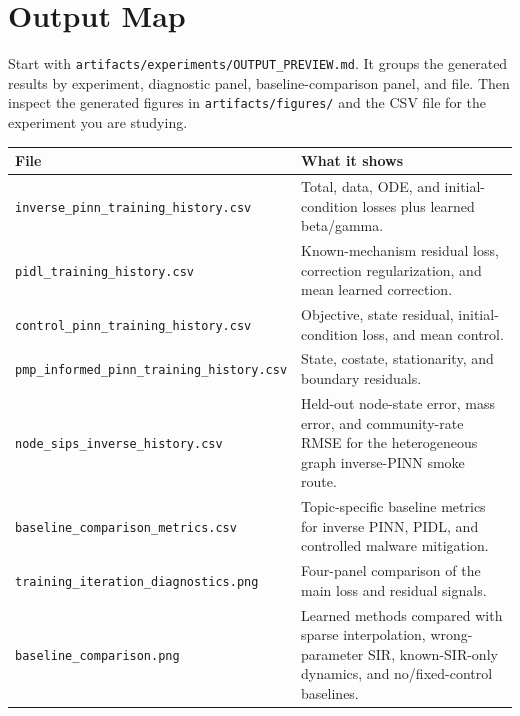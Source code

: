 \documentclass[11pt,a4paper]{article}
\begin{document}
\section{Output Map}
Start with \texttt{artifacts/experiments/OUTPUT\_PREVIEW.md}. It groups the generated results by experiment, diagnostic panel, baseline-comparison panel, and file. Then inspect the generated figures in \texttt{artifacts/figures/} and the CSV file for the experiment you are studying.

\begin{longtable}{p{}p{}}
\toprule
File & What it shows \\
\midrule
\texttt{inverse\_pinn\_}\newline\texttt{training\_history.csv} & Total, data, ODE, and initial-condition losses plus learned beta/gamma. \\
\texttt{pidl\_}\newline\texttt{training\_history.csv} & Known-mechanism residual loss, correction regularization, and mean learned correction. \\
\texttt{control\_pinn\_}\newline\texttt{training\_history.csv} & Objective, state residual, initial-condition loss, and mean control. \\
\texttt{pmp\_informed\_pinn\_}\newline\texttt{training\_history.csv} & State, costate, stationarity, and boundary residuals. \\
\texttt{node\_sips\_inverse\_}\newline\texttt{history.csv} & Held-out node-state error, mass error, and community-rate RMSE for the heterogeneous graph inverse-PINN smoke route. \\
\texttt{baseline\_comparison\_}\newline\texttt{metrics.csv} & Topic-specific baseline metrics for inverse PINN, PIDL, and controlled malware mitigation. \\
\texttt{training\_iteration\_}\newline\texttt{diagnostics.png} & Four-panel comparison of the main loss and residual signals. \\
\texttt{baseline\_comparison}\newline\texttt{.png} & Learned methods compared with sparse interpolation, wrong-parameter SIR, known-SIR-only dynamics, and no/fixed-control baselines. \\
\bottomrule
\end{longtable}
\end{document}

